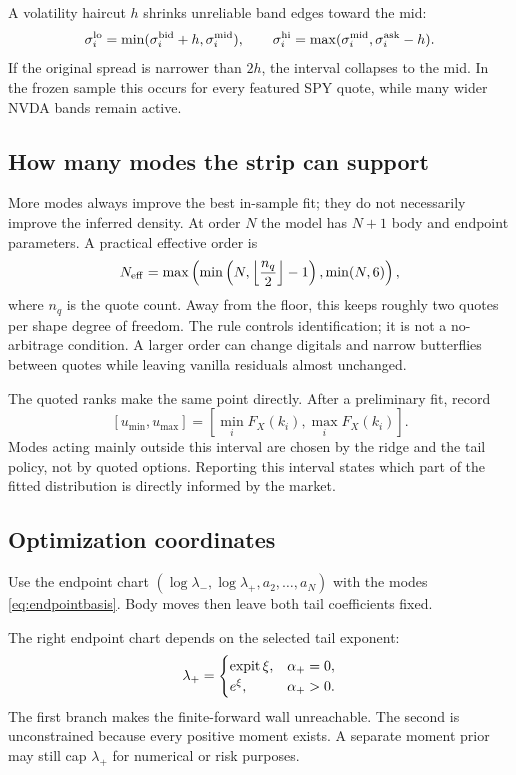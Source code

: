 A volatility haircut $h$ shrinks unreliable band edges toward the mid:
\begin{equation}
\sigma_i^{\rm lo}=\min(\sigma_i^{\rm bid}+h,\sigma_i^{\rm mid}),
\qquad
\sigma_i^{\rm hi}=\max(\sigma_i^{\rm mid},\sigma_i^{\rm ask}-h).
\label{eq:haircut}
\end{equation}
If the original spread is narrower than $2h$, the interval collapses to the
mid.  In the frozen sample this occurs for every featured SPY quote, while
many wider NVDA bands remain active.

\subsection{How many modes the strip can support}
\label{sec:orderguard}

More modes always improve the best in-sample fit; they do not necessarily
improve the inferred density.  At order $N$ the model has $N+1$ body and
endpoint parameters.  A practical effective order is
\begin{equation}
N_{\rm eff}=\max\left(
\min\left(N,\left\lfloor\frac{n_q}{2}\right\rfloor-1\right),
\min(N,6)\right),
\label{eq:orderguard}
\end{equation}
where $n_q$ is the quote count.  Away from the floor, this keeps roughly two
quotes per shape degree of freedom.  The rule controls identification; it is
not a no-arbitrage condition.  A larger order can change digitals and narrow
butterflies between quotes while leaving vanilla residuals almost unchanged.

The quoted ranks make the same point directly.  After a preliminary fit,
record
\[
[u_{\min},u_{\max}]
=\left[\min_iF_X(k_i),\max_iF_X(k_i)\right].
\]
Modes acting mainly outside this interval are chosen by the ridge and the
tail policy, not by quoted options.  Reporting this interval states which part
of the fitted distribution is directly informed by the market.

\subsection{Optimization coordinates}
\label{sec:charts}

Use the endpoint chart
$(\log\lambda_-,\log\lambda_+,a_2,\ldots,a_N)$ with the modes
\eqref{eq:endpointbasis}.  Body moves then leave both tail coefficients fixed.

The right endpoint chart depends on the selected tail exponent:
\begin{equation}
\lambda_+=
\begin{cases}
\operatorname{expit}\xi,&\alpha_+=0,\\
e^\xi,&\alpha_+>0.
\end{cases}
\label{eq:rightchart}
\end{equation}
The first branch makes the finite-forward wall unreachable.  The second is
unconstrained because every positive moment exists.  A separate moment prior
may still cap $\lambda_+$ for numerical or risk purposes.

